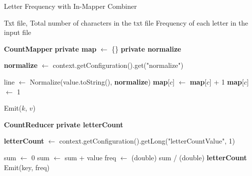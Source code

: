     \begin{algorithm}[H]
    \caption{Letter Frequency with In-Mapper Combiner}
    \begin{algorithmic}[1]
    \Require Txt file, Total number of characters in the txt file
    \Ensure Frequency of each letter in the input file
    
    \vspace{1em}

    \Statex
    \noindent \textbf{CountMapper}
        \State \textbf{private map} $\leftarrow$ \{\}
        \State \textbf{private normalize}
    
            \State \textbf{normalize} $\leftarrow$ context.getConfiguration().get("normalize")
        \EndProcedure
    
            \State line $\leftarrow$ Normalize(value.toString(), \textbf{normalize})
                        \State \textbf{map}[$c$] $\leftarrow$ \textbf{map}[$c$] + 1
                    \Else
                        \State \textbf{map}[$c$] $\leftarrow$ 1
                    \EndIf
                \EndIf
            \EndFor
        \EndProcedure
    
                \State Emit($k$, $v$)
            \EndFor
        \EndProcedure
    
        \vspace{1em}

    \Statex
    \noindent \textbf{CountReducer}
        \State \textbf{private letterCount}
    
            \State \textbf{letterCount} $\leftarrow$ context.getConfiguration().getLong("letterCountValue", 1)
        \EndProcedure
    
            \State sum $\leftarrow$ 0
                \State sum $\leftarrow$ sum + value
            \EndFor
            \State freq $\leftarrow$ (double) sum / (double) \textbf{letterCount}
            \State Emit(key, freq)
        \EndProcedure

    \end{algorithmic}
    \end{algorithm}
    